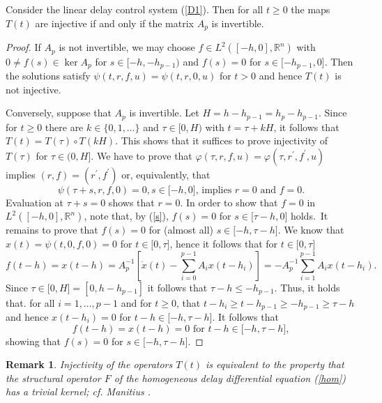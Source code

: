 \documentclass{siamltex}%
\newtheorem{remark}[theorem]{Remark}
\begin{document}
\begin{proposition}
\label{Proposition_injective1}Consider the linear delay control system
(\ref{D1}). Then for all $t\geq0$ the maps $T(t)$ are injective if and only if
the matrix $A_{p}$ is invertible.
\end{proposition}

\begin{proof}
If $A_{p}$ is not invertible, we may choose $f\in L^{2}([-h,0],\mathbb{R}%
^{n})$ with $0\not =f(s)\in\ker A_{p}$ for $s\in\lbrack-h,-h_{p-1})$ and
$f(s)=0$ for $s\in\lbrack-h_{p-1},0]$. Then the solutions satisfy
$\psi(t,r,f,u)=\psi(t,r,0,u)$ for $t>0$ and hence $T(t)$ is not injective.

Conversely, suppose that $A_{p}$ is invertible. Let $H=h-h_{p-1}=h_{p}%
-h_{p-1}$. Since for $t\geq0$ there are $k\in\{0,1,\ldots\}$ and $\tau
\in\lbrack0,H)$ with $t=\tau+kH$, it follows that $T(t)=T(\tau)\circ T(kH)$.
This shows that it suffices to prove injectivity of $T(\tau)$ for $\tau
\in(0,H]$. We have to prove that $\varphi(\tau,r,f,u)=\varphi(\tau,r^{\prime
},f^{\prime},u)$ implies $(r,f)=(r^{\prime},f^{\prime})$ or, equivalently,
that%
\begin{equation}
\psi(\tau+s,r,f,0)=0,s\in\lbrack-h,0]\text{, implies }r=0\text{ and }f=0.
\label{s}%
\end{equation}
Evaluation at $\tau+s=0$ shows that $r=0$. In order to show that $f=0$ in
$L^{2}([-h,0],\mathbb{R}^{n})$, note that, by (\ref{s}), $f(s)=0$ for
$s\in\lbrack\tau-h,0]$ holds.\ It remains to prove that $f(s)=0$ for (almost
all) $s\in\lbrack-h,\tau-h]$. We know that $x(t)=\psi(t,0,f,0)=0$ for
$t\in\lbrack0,\tau]$, hence it follows that for $t\in\lbrack0,\tau]$%
\[
f(t-h)=x(t-h)=A_{p}^{-1}\left[  \dot{x}(t)-\sum_{i=0}^{p-1}A_{i}%
x(t-h_{i})\right]  =-A_{p}^{-1}\sum_{i=1}^{p-1}A_{i}x(t-h_{i}).
\]
Since $\tau\in\lbrack0,H]=[0,h-h_{p-1}]$ it follows that $\tau-h\leq-h_{p-1}$.
Thus, it holds that. for all $i=1,\ldots,p-1$ and for $t\geq0$, that
$t-h_{i}\geq t-h_{p-1}\geq-h_{p-1}\geq\tau-h$ and hence $x(t-h_{i})=0$ for
$t-h\in\lbrack-h,\tau-h]$. It follows that%
\[
f(t-h)=x(t-h)=0\text{ for }t-h\in\lbrack-h,\tau-h],
\]
showing that $f(s)=0$ for $s\in\lbrack-h,\tau-h]$.
\end{proof}

\begin{remark}
Injectivity of the operators $T(t)$ is equivalent to the property that the
structural operator $F$ of the homogeneous delay differential equation
(\ref{hom}) has a trivial kernel; cf. Manitius \cite{Mani80}.
\end{remark}
\end{document}

